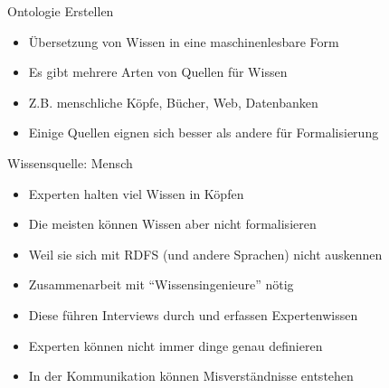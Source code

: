 \documentclass{beamer}
\begin{document}
\begin{frame}{Ontologie Erstellen}
	
	\begin{itemize}
		\item Übersetzung von Wissen in eine maschinenlesbare Form
		\item Es gibt mehrere Arten von Quellen für Wissen
		\item Z.B. menschliche Köpfe, Bücher, Web, Datenbanken
		\item Einige Quellen eignen sich besser als andere für Formalisierung
	\end{itemize}
	
\end{frame}

\begin{frame}{Wissensquelle: Mensch}
	
	\begin{itemize}
		\item Experten halten viel Wissen in Köpfen
		\item Die meisten können Wissen aber nicht formalisieren
		\item Weil sie sich mit RDFS (und andere Sprachen) nicht auskennen
		\item Zusammenarbeit mit ``Wissensingenieure'' nötig
		\item Diese führen Interviews durch und erfassen Expertenwissen
		\item Experten können nicht immer dinge genau definieren
		\item In der Kommunikation können Misverständnisse entstehen
	\end{itemize}
	
\end{frame}
\end{document}
